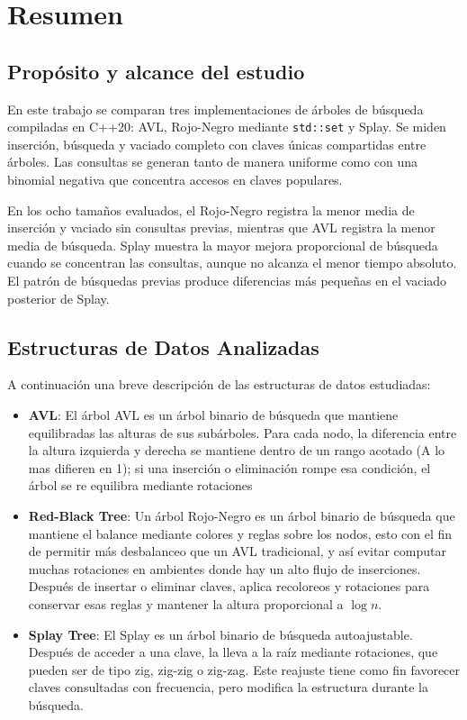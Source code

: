 \documentclass[11pt,letterpaper]{article}
\begin{document}
\pagestyle{plain}
\tableofcontents
\newpage

\pagestyle{fancy}


\section{Resumen}
\subsection{Propósito y alcance del estudio}

En este trabajo se comparan tres implementaciones de árboles de búsqueda
compiladas en C++20: AVL, Rojo-Negro mediante \texttt{std::set} y Splay. Se
miden inserción, búsqueda y vaciado completo con claves únicas compartidas
entre árboles. Las consultas se generan tanto de manera uniforme como con
una binomial negativa que concentra accesos en claves populares.

En los ocho tamaños evaluados, el Rojo-Negro registra la menor media de
inserción y vaciado sin consultas previas, mientras que AVL registra la menor
media de búsqueda. Splay muestra la mayor mejora proporcional de búsqueda
cuando se concentran las consultas, aunque no alcanza el menor tiempo
absoluto. El patrón de búsquedas previas produce diferencias más pequeñas en
el vaciado posterior de Splay.


\subsection{Estructuras de Datos Analizadas}

A continuación una breve descripción de las estructuras de datos estudiadas:

\begin{itemize}
    \item \textbf{AVL}: El árbol AVL es un árbol binario de búsqueda que mantiene equilibradas las alturas de sus subárboles. Para cada nodo, la diferencia entre la altura izquierda y derecha se mantiene dentro de un rango acotado (A lo mas difieren en 1); si una inserción o eliminación rompe esa condición, el árbol se re equilibra mediante rotaciones
     \item \textbf{Red-Black Tree}: Un árbol Rojo-Negro es un árbol binario de búsqueda que mantiene el balance mediante colores y reglas sobre los nodos, esto con el fin de permitir más desbalanceo que un AVL tradicional, y así evitar computar muchas rotaciones en ambientes donde hay un alto flujo de inserciones. Después de insertar o eliminar claves, aplica recoloreos y rotaciones para conservar esas reglas y mantener la altura proporcional a \(\log n\).
      \item \textbf{Splay Tree}: El Splay es un árbol binario de búsqueda autoajustable. Después de acceder a una clave, la lleva a la raíz mediante rotaciones, que pueden ser de tipo zig, zig-zig o zig-zag. Este reajuste tiene como fin favorecer claves consultadas con frecuencia, pero modifica la estructura durante la búsqueda.
\end{itemize}
\end{document}
